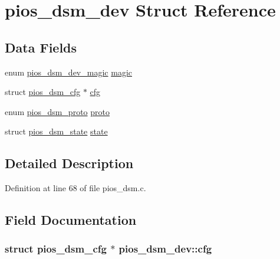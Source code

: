 \hypertarget{structpios__dsm__dev}{\section{pios\-\_\-dsm\-\_\-dev Struct Reference}
\label{structpios__dsm__dev}
}
\subsection*{Data Fields}
\begin{DoxyCompactItemize}
\item 
enum \hyperlink{group___p_i_o_s___d_s_m_gaa8fd2b8b7432f69244c6af0ffd1c3c4b}{pios\-\_\-dsm\-\_\-dev\-\_\-magic} \hyperlink{structpios__dsm__dev_af1374f09784777b8222cd59d6c41ba1f}{magic}
\item 
struct \hyperlink{structpios__dsm__cfg}{pios\-\_\-dsm\-\_\-cfg} $\ast$ \hyperlink{structpios__dsm__dev_af3f5de7ec63a657c04db4bc6480b8c87}{cfg}
\item 
enum \hyperlink{group___p_i_o_s___d_s_m_ga0c64890f0b9cb4fd7681b2d92fad8bd9}{pios\-\_\-dsm\-\_\-proto} \hyperlink{structpios__dsm__dev_a1f236c86046b7aa2f08742d1c9c03940}{proto}
\item 
struct \hyperlink{structpios__dsm__state}{pios\-\_\-dsm\-\_\-state} \hyperlink{structpios__dsm__dev_a03ca4dcf548ecee1772b76d3eefad122}{state}
\end{DoxyCompactItemize}


\subsection{Detailed Description}


Definition at line 68 of file pios\-\_\-dsm.\-c.



\subsection{Field Documentation}
\hypertarget{structpios__dsm__dev_af3f5de7ec63a657c04db4bc6480b8c87}{
\subsubsection[{cfg}]{\setlength{\rightskip}{0pt plus 5cm}struct {\bf pios\-\_\-dsm\-\_\-cfg} $\ast$ pios\-\_\-dsm\-\_\-dev\-::cfg}}\label{structpios__dsm__dev_af3f5de7ec63a657c04db4bc6480b8c87}


